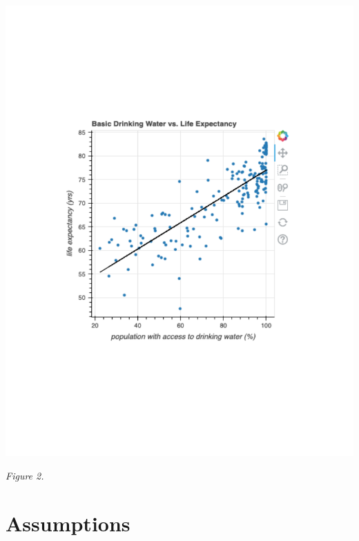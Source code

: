 \documentclass[12pt]{article}
\begin{document}
\begin{center}
\includegraphics[width=6in]{figure4.pdf}
\end{center}

\vspace{-160pt}

\begin{center}
    \textit{Figure 2.}
\end{center}

\vspace{20pt}

\section*{Assumptions}
\end{document}
